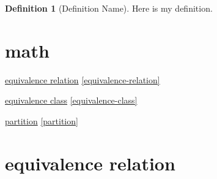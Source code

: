 \documentclass[
]{book}
\theoremstyle{definition}
\newtheorem{definition}{Definition}[chapter]
\theoremstyle{definition}
\theoremstyle{definition}
\theoremstyle{definition}
\theoremstyle{remark}
\begin{document}
\begin{definition}[Definition Name]
\protect\hypertarget{def:unnamed-chunk-2}{}\label{def:unnamed-chunk-2}Here is my definition.
\end{definition}

\hypertarget{nice-label}{%
\chapter{math}\label{nice-label}}

\protect\hyperlink{equivalence-relation}{equivalence relation} \ref{equivalence-relation}

\protect\hyperlink{equivalence-class}{equivalence class} \ref{equivalence-class}

\protect\hyperlink{partition}{partition} \ref{partition}

\hypertarget{equivalence-relation}{%
\chapter*{equivalence relation}\label{equivalence-relation}}
\end{document}
